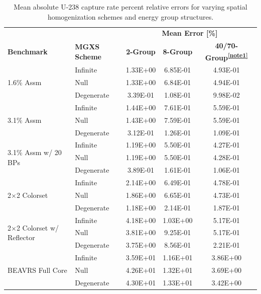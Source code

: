 \begin{table}[h!]
  \centering
  \caption[Mean OpenMOC U-238 capture rate errors]{Mean absolute U-238 capture rate percent relative errors for varying spatial homogenization schemes and energy group structures.}
  \small
  \label{table:chap8-openmoc-mean-capt-rates}
  \vspace{6pt}
  \begin{tabular}{l l c c c}
  \toprule
  \rowcolor{lightgray}
  & & \multicolumn{3}{c}{\cellcolor{lightgray} \textbf{Mean Error [\%]}} \\
  \multirow{-2}{*}{\cellcolor{lightgray} \bf Benchmark} &
  \multirow{-2}{*}{\cellcolor{lightgray} \bf \ac{MGXS} Scheme} &
  \multicolumn{1}{c}{{\cellcolor{lightgray} \bf 2-Group}} &
  \multicolumn{1}{c}{{\cellcolor{lightgray} \bf 8-Group}} &
  \multicolumn{1}{c}{{\cellcolor{lightgray} \bf 40/70-Group\textsuperscript{\ref{note1}}}} \\
  \midrule
\multirow{3}{*}{\parbox{2.5cm}{1.6\% Assm}} & Infinite & 1.33E+00 & 6.85E-01 & 4.93E-01 \\
& Null & 1.33E+00 & 6.84E-01 & 4.94E-01 \\
& Degenerate & 3.39E-01 & 1.08E-01 & 9.98E-02 \\
  \midrule
\multirow{3}{*}{\parbox{2.5cm}{3.1\% Assm}} & Infinite & 1.44E+00 & 7.61E-01 & 5.59E-01 \\
& Null & 1.43E+00 & 7.59E-01 & 5.59E-01 \\
& Degenerate & 3.12E-01 & 1.26E-01 & 1.09E-01 \\
  \midrule
\multirow{3}{*}{\parbox{2.5cm}{3.1\% Assm w/ 20 BPs}} & Infinite & 1.19E+00 & 5.50E-01 & 4.27E-01 \\
& Null & 1.19E+00 & 5.50E-01 & 4.28E-01 \\
& Degenerate & 3.89E-01 & 1.61E-01 & 1.06E-01 \\
  \midrule
\multirow{3}{*}{\parbox{2.5cm}{2$\times$2 Colorset}} & Infinite & 2.14E+00 & 6.49E-01 & 4.78E-01 \\
& Null & 1.86E+00 & 6.65E-01 & 4.73E-01 \\
& Degenerate & 1.18E+00 & 2.14E-01 & 1.87E-01 \\
  \midrule
\multirow{3}{*}{\parbox{2.5cm}{2$\times$2 Colorset w/ Reflector}} & Infinite & 4.18E+00 & 1.03E+00 & 5.17E-01 \\
& Null & 3.81E+00 & 9.25E-01 & 5.17E-01 \\
& Degenerate & 3.75E+00 & 8.56E-01 & 2.21E-01 \\
  \midrule
\multirow{3}{*}{\parbox{2.5cm}{BEAVRS Full Core}} & Infinite & 3.59E+01 & 1.16E+01 & 3.86E+00 \\
& Null & 4.26E+01 & 1.32E+01 & 3.69E+00 \\
& Degenerate & 4.30E+01 & 1.33E+01 & 3.42E+00 \\
  \bottomrule
\end{tabular}
\end{table}

